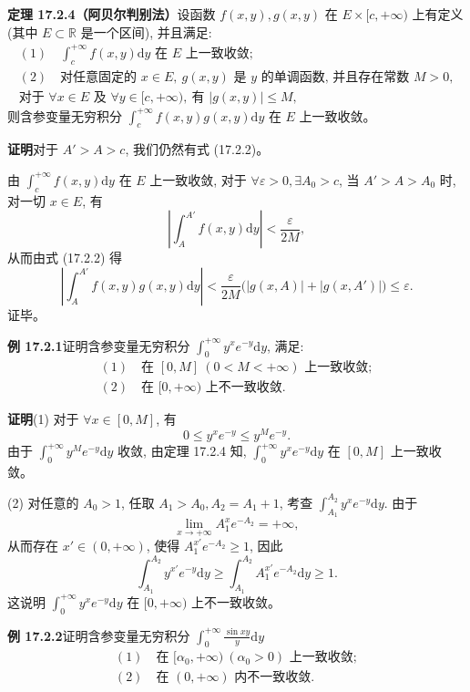 \documentclass[UTF8, 12pt, fontset=fandol, oneside]{ctexart}
\begin{document}
\noindent\textbf{定理 17.2.4（阿贝尔判别法）}\quad 设函数 $f(x,y),g(x,y)$ 在 $E\times[c,+\infty)$ 上有定义 (其中 $E\subset\mathbb R$ 是一个区间), 并且满足:
\[
\begin{gathered}
  (1)\quad \int_c^{+\infty}f(x,y)\mathrm dy \text{ 在 } E \text{ 上一致收敛};\\
  (2)\quad \text{对任意固定的 } x\in E,\ g(x,y) \text{ 是 } y \text{ 的单调函数, 并且存在常数 } M>0,\\
  \text{对于 } \forall x\in E \text{ 及 } \forall y\in[c,+\infty),\ \text{有 } |g(x,y)|\leqslant M,
\end{gathered}
\]
则含参变量无穷积分 $\int_c^{+\infty}f(x,y)g(x,y)\mathrm dy$ 在 $E$ 上一致收敛。

\noindent\textbf{证明}\quad 对于 $A'>A>c$, 我们仍然有式 (17.2.2)。

由 $\int_c^{+\infty}f(x,y)\mathrm dy$ 在 $E$ 上一致收敛, 对于 $\forall\varepsilon>0,\exists A_0>c$, 当 $A'>A>A_0$ 时, 对一切 $x\in E$, 有
\[
  \left|\int_A^{A'}f(x,y)\mathrm dy\right|<\frac{\varepsilon}{2M},
\]
从而由式 (17.2.2) 得
\[
  \left|\int_A^{A'}f(x,y)g(x,y)\mathrm dy\right|
  <\frac{\varepsilon}{2M}\bigl(|g(x,A)|+|g(x,A')|\bigr)\leqslant\varepsilon.
\]
证毕。

\noindent\textbf{例 17.2.1}\quad 证明含参变量无穷积分 $\int_0^{+\infty}y^xe^{-y}\mathrm dy$, 满足:
\[
\begin{gathered}
  (1)\quad \text{在 } [0,M]\ (0<M<+\infty) \text{ 上一致收敛};\\
  (2)\quad \text{在 } [0,+\infty) \text{ 上不一致收敛}.
\end{gathered}
\]

\noindent\textbf{证明}\quad (1) 对于 $\forall x\in[0,M]$, 有
\[
  0\leqslant y^xe^{-y}\leqslant y^M e^{-y}.
\]
由于 $\int_0^{+\infty}y^M e^{-y}\mathrm dy$ 收敛, 由定理 17.2.4 知, $\int_0^{+\infty}y^xe^{-y}\mathrm dy$ 在 $[0,M]$ 上一致收敛。

(2) 对任意的 $A_0>1$, 任取 $A_1>A_0,A_2=A_1+1$, 考查 $\int_{A_1}^{A_2}y^xe^{-y}\mathrm dy$. 由于
\[
  \lim_{x\to+\infty}A_1^x e^{-A_2}=+\infty,
\]
从而存在 $x'\in(0,+\infty)$, 使得 $A_1^{x'}e^{-A_2}\geqslant1$, 因此
\[
  \int_{A_1}^{A_2}y^{x'}e^{-y}\mathrm dy
  \geqslant \int_{A_1}^{A_2}A_1^{x'}e^{-A_2}\mathrm dy\geqslant1.
\]
这说明 $\int_0^{+\infty}y^xe^{-y}\mathrm dy$ 在 $[0,+\infty)$ 上不一致收敛。

\noindent\textbf{例 17.2.2}\quad 证明含参变量无穷积分 $\int_0^{+\infty}\frac{\sin xy}{y}\mathrm dy$
\[
\begin{gathered}
  (1)\quad \text{在 } [\alpha_0,+\infty)\ (\alpha_0>0) \text{ 上一致收敛};\\
  (2)\quad \text{在 } (0,+\infty) \text{ 内不一致收敛}.
\end{gathered}
\]
\end{document}
